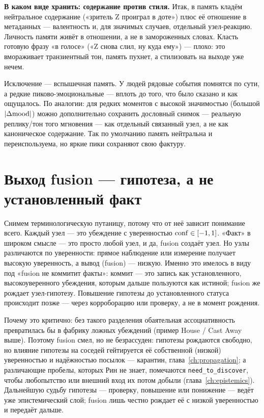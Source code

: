 \smallskip\noindent\textbf{В каком виде хранить: содержание против стиля.}
Итак, в память кладём нейтральное содержание («зритель Z проиграл в доте») плюс
её отношение в метаданных --- валентность и, для значимых случаев, отдельный
узел-реакцию. Личность памяти живёт в отношении, а не в замороженных словах.
Класть готовую фразу «в голосе» («Z снова слил, ну куда ему») --- плохо: это
вмораживает транзиентный тон, память пухнет, а стилизовать на выходе уже
нечем.

Исключение --- вспышечная память. У людей рядовые события помнятся по сути, а
редкие пиково-эмоциональные --- вплоть до того, что было сказано и как
ощущалось. По аналогии: для редких моментов с высокой значимостью (большой
$|\Delta \mathrm{mood}|$) можно дополнительно сохранить дословный снимок --- реальную
реплику/тон того мгновения --- как отдельный связанный узел, а не как
каноническое содержание. Так по умолчанию память нейтральна и переиспользуема,
но яркие пики сохраняют свою фактуру.

\section{Выход fusion --- гипотеза, а не установленный факт}

Снимем терминологическую путаницу, потому что от неё зависит понимание всего.
Каждый узел --- это убеждение с уверенностью $\mathrm{conf} \in [-1,1]$. «Факт» в
широком смысле --- это просто любой узел, и да, fusion создаёт узел. Но узлы
различаются по уверенности: прямое наблюдение или измерение получает высокую
уверенность, а вывод (fusion) --- низкую. Именно это имелось в виду под
«fusion не коммитит факты»: коммит --- это запись как установленного,
высокоуверенного убеждения, которым дальше пользуются как истиной; fusion же
рождает узел-гипотезу. Повышение гипотезы до установленного статуса происходит
позже --- через корроборацию или проверку, а не в момент рождения.

Почему это критично: без такого разделения обаятельная ассоциативность
превратилась бы в фабрику ложных убеждений (пример House / Cast Away выше).
Поэтому fusion смел, но не безрассуден: гипотезы рождаются свободно, но влияние
гипотезы на соседей гейтируется её собственной (низкой) уверенностью и
надёжностью посылок --- карантин, глава~\ref{ch:propagation}; а различающие
пробелы, которых Рин не знает, помечаются \texttt{need\_to\_discover}, чтобы
любопытство или внешний вход их потом добыли (глава~\ref{ch:epistemics}).
Дальнейшую судьбу гипотезы --- проверку, повышение или понижение --- ведёт уже
эпистемический слой; fusion лишь честно рождает её с низкой уверенностью и
передаёт дальше.

